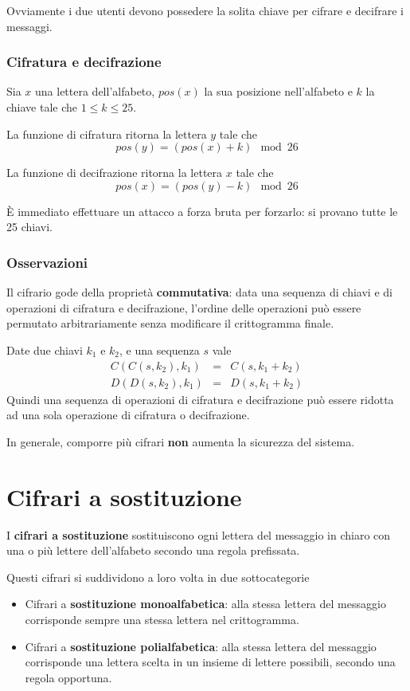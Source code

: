 Ovviamente i due utenti devono possedere la solita chiave per cifrare e decifrare i messaggi.

\subsubsection{Cifratura e decifrazione}
Sia $x$ una lettera dell'alfabeto, $pos(x)$ la sua posizione nell'alfabeto e $k$ la chiave tale che $1 \leq k \leq 25$.

La funzione di cifratura ritorna la lettera $y$ tale che
\[ pos(y) = (pos(x) + k) \mod{26} \]

La funzione di decifrazione ritorna la lettera $x$ tale che
\[ pos(x) = (pos(y) - k) \mod{26} \]

\`E immediato effettuare un attacco a forza bruta per forzarlo: si provano tutte le 25 chiavi.

\subsubsection{Osservazioni}
Il cifrario gode della propriet\`a \textbf{commutativa}: data una sequenza di chiavi e di operazioni di cifratura e
decifrazione, l'ordine delle operazioni pu\`o essere permutato arbitrariamente senza modificare il crittogramma finale.

Date due chiavi $k_1$ e $k_2$, e una sequenza $s$ vale
\[
	\begin{matrix}
		C(C(s, k_2), k_1) & = & C(s, k_1 + k_2) \\
		D(D(s, k_2), k_1) & = & D(s, k_1 + k_2)
	\end{matrix}
\]
Quindi una sequenza di operazioni di cifratura e decifrazione pu\`o essere ridotta ad una sola operazione di cifratura
o decifrazione.

In generale, comporre pi\`u cifrari \textbf{non} aumenta la sicurezza del sistema.

\section{Cifrari a sostituzione}
I \textbf{cifrari a sostituzione} sostituiscono ogni lettera del messaggio in chiaro con una o pi\`u lettere
dell'alfabeto secondo una regola prefissata.

Questi cifrari si suddividono a loro volta in due sottocategorie
\begin{itemize}
	\item Cifrari a \textbf{sostituzione monoalfabetica}: alla stessa lettera del messaggio corrisponde sempre una
	      stessa lettera nel crittogramma.
	\item Cifrari a \textbf{sostituzione polialfabetica}: alla stessa lettera del messaggio corrisponde una lettera
	      scelta in un insieme di lettere possibili, secondo una regola opportuna.
\end{itemize}

